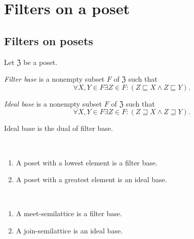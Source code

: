 \section{Filters on a poset}


\subsection{Filters on posets}

Let $\mathfrak{Z}$ be a poset.
\begin{defn}
\emph{Filter base} is a nonempty subset $F$ of
$\mathfrak{Z}$ such that
\[
\forall X,Y\in F\exists Z\in F:(Z\sqsubseteq X\land Z\sqsubseteq Y).
\]
\end{defn}
\begin{defn}
\emph{Ideal base} is a nonempty subset $F$ of
$\mathfrak{Z}$ such that
\[
\forall X,Y\in F\exists Z\in F:(Z\sqsupseteq X\land Z\sqsupseteq Y).
\]
\end{defn}

\begin{obvious}
Ideal base is the dual of filter base.
\end{obvious}

\begin{obvious}
~
\begin{enumerate}
  \item A poset with a lowest element is a filter base.
  \item A poset with a greatest element is an ideal base.
\end{enumerate}
\end{obvious}

\begin{obvious}
~
\begin{enumerate}
  \item A meet-semilattice is a filter base.
  \item A join-semilattice is an ideal base.
\end{enumerate}
\end{obvious}

